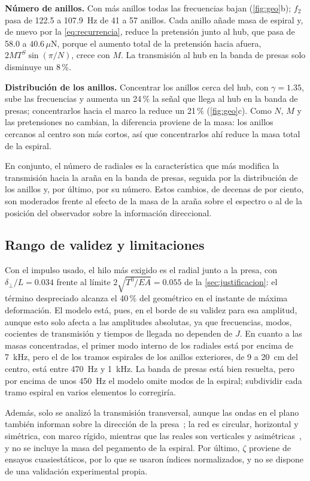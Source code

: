 \documentclass[fleqn,final]{jaes}
\newcommand{\uN}{\,\mu\mathrm{N}}
\begin{document}
\textbf{Número de anillos.} Con más anillos todas las frecuencias bajan
(\cref{fig:geo}b); $f_2$ pasa de 122.5 a 107.9~Hz de 41 a 57 anillos.
Cada anillo añade masa de espiral y, de nuevo por la
\cref{eq:recurrencia}, reduce la pretensión junto al hub, que pasa de
58.0 a $40.6\uN$, porque el aumento total de la pretensión hacia afuera,
$2MT^S\sin(\pi/N)$, crece con $M$. La transmisión al hub en la banda de
presas solo disminuye un 8\,\%.

\textbf{Distribución de los anillos.} Concentrar los anillos cerca del
hub, con $\gamma=1.35$, sube las frecuencias y aumenta un 24\,\% la señal que
llega al hub en la banda de presas; concentrarlos hacia el marco la
reduce un 21\,\% (\cref{fig:geo}c). Como $N$, $M$ y las pretensiones no
cambian, la diferencia proviene de la masa: los anillos cercanos al
centro son más cortos, así que concentrarlos ahí reduce la masa total de
la espiral.

En conjunto, el
número de radiales es la característica que más modifica la transmisión
hacia la araña en la banda de presas, seguida por la distribución de los
anillos y, por último, por su número. Estos cambios, de decenas de por
ciento, son moderados frente al efecto de la masa de la araña sobre el
espectro o al de la posición del observador sobre la información
direccional.

\subsection{Rango de validez y limitaciones}\label{sec:validez}

Con el impulso usado, el hilo más exigido es el radial junto a la presa,
con $\delta_\perp/L=0.034$ frente al límite $2\sqrt{T^0/EA}=0.055$ de la
\cref{sec:justificacion}: el término despreciado alcanza el 40\,\% del
geométrico en el instante de máxima deformación. El modelo está, pues, en
el borde de su validez para esa amplitud, aunque esto solo afecta a las
amplitudes absolutas, ya que frecuencias, modos, cocientes de transmisión
y tiempos de llegada no dependen de $J$. En cuanto a las masas
concentradas, el primer modo interno de los radiales está por encima de
7~kHz, pero el de los tramos espirales de los anillos exteriores, de 9 a
20~cm del centro, está entre 470~Hz y 1~kHz. La banda de presas está bien
resuelta, pero por encima de unos 450~Hz el modelo omite modos de la
espiral; subdividir cada tramo espiral en varios elementos lo corregiría.

Además, solo se analizó la transmisión transversal, aunque las ondas en
el plano también informan sobre la dirección de la
presa~\cite{mortimer2019decoding}; la red es circular, horizontal y
simétrica, con marco rígido, mientras que las reales son verticales y
asimétricas~\cite{yavuz2024}, y no se incluye la masa del pegamento de
la espiral. Por último, $\zeta$ proviene de
ensayos cuasiestáticos, por lo que se usaron índices normalizados, y no se
dispone de una validación experimental propia.
\end{document}
